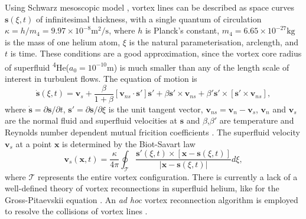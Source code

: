 \documentclass[9pt,twoside]{pnas-new}
\def \s{\mathbf{s}}
\def \v{\mathbf{v}}
\def \x{\mathbf{x}}
\begin{document}
Using Schwarz mesoscopic model \cite{schwarzThreedimensionalVortexDynamics1988a}, vortex lines can be described as space curves $\s(\xi,t)$ of infinitesimal thickness, with a single quantum of circulation $\kappa=h/m_4=9.97\times10^{-8}\text{m}^2/\text{s}$, where $h$ is Planck's constant, $m_4=6.65\times10^{-27}\text{kg}$ is the mass of one helium atom, $\xi$ is the natural parameterisation, arclength, and $t$ is time. These conditions are a good approximation, since the vortex core radius of superfluid \textsuperscript{4}He($a_0=10^{-10}\text{m}$) is much smaller than any of the length scale of interest in turbulent flows. The equation of motion is
\begin{equation}
	\dot{\s}(\xi,t) = \v_s + \frac{\beta}{1+\beta}\left[\v_{ns}\cdot \s'\right]\s' + \beta\s'\times\v_{ns}+\beta'\s'\times\left[\s'\times \v_{ns}\right],
\end{equation}
where $\dot{\s}=\partial\s/\partial t$, $\s'=\partial\s/\partial \xi$ is the unit tangent vector, $\v_{ns}=\v_n - \v_s$, $\v_n$ and $\v_s$ are the normal fluid and superfluid velocities at $\s$ and $\beta$,$\beta'$ are temperature and Reynolds number dependent mutual fricition coefficients \cite{galantucciNewSelfconsistentApproach2020b}. The superfluid velocity $\v_s$ at a point $\x$ is determined by the Biot-Savart law
\begin{equation}
	\v_s(\x,t) = \frac{\kappa}{4\pi}\oint_{\mathcal{T}}\frac{\s'(\xi,t)\times\left[\x-\s(\xi,t)\right]}{|\x-\s(\xi,t)|}d\xi,
\end{equation}
where $\mathcal{T}$ represents the entire vortex configuration.
There is currently a lack of a well-defined theory of vortex reconnections in superfluid helium, like for the Gross-Pitaevskii equation \cite{villoisIrreversibleDynamicsVortex2020,villoisUniversalNonuniversalAspects2017a,promentMatchingTheoryCharacterize2020a}. An \emph{ad hoc} vortex reconnection algorithm is employed to resolve the collisions of vortex lines \cite{baggaleySensitivityVortexFilament2012a}.
\end{document}
